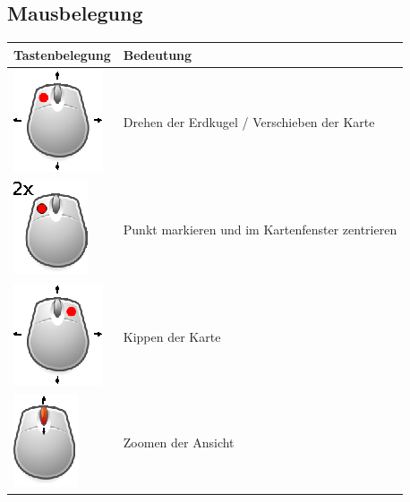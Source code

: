 \documentclass[10pt]{scrreprt}
\begin{document}
\subsection{Mausbelegung}
\vspace{3mm}
\begin{center}
\begin{tabular}{|>{\centering \arraybackslash}m{3cm}|m{9cm}|}
\hline 

\rule[-1ex]{0pt}{4ex} \sffamily\textbf{Tastenbelegung} &\rule[-1ex]{0pt}{4ex} \sffamily\textbf{Bedeutung} \\ 
\hline
\hline
\includegraphics[scale=1.0]{KeyImages/mouseDrag_left.eps} & Drehen der Erdkugel / Verschieben der Karte \\ 
\hline 
\includegraphics[scale=1.0]{KeyImages/mouseDoubleClick_left.eps} & Punkt markieren und im Kartenfenster zentrieren \\
\hline
\includegraphics[scale=1.0]{KeyImages/mouseDrag_right.eps} & Kippen der Karte \\
\hline
\includegraphics[scale=1.0]{KeyImages/mouse_scrollen.eps} & Zoomen der Ansicht \\
\hline
\end{tabular} 
\end{center}
\end{document}
